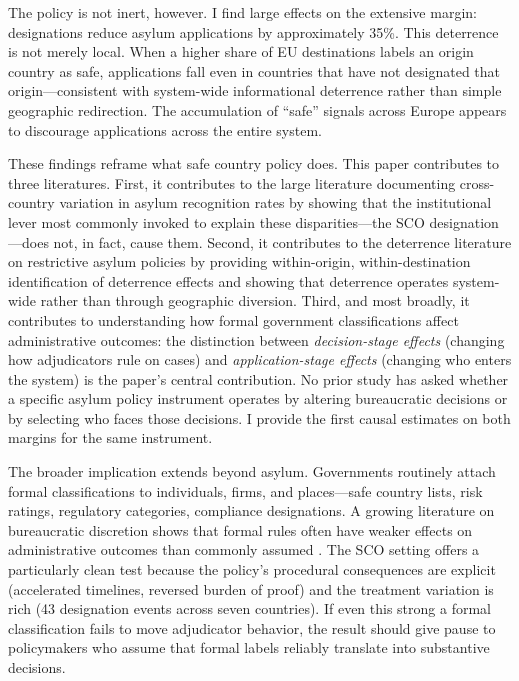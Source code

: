 \documentclass[12pt]{article}
\begin{document}
The policy is not inert, however. I find large effects on the extensive margin: designations reduce asylum applications by approximately 35\%. This deterrence is not merely local. When a higher share of EU destinations labels an origin country as safe, applications fall even in countries that have not designated that origin---consistent with system-wide informational deterrence rather than simple geographic redirection. The accumulation of ``safe'' signals across Europe appears to discourage applications across the entire system.

These findings reframe what safe country policy does. This paper contributes to three literatures. First, it contributes to the large literature documenting cross-country variation in asylum recognition rates \citep{neumayer2005asylum, hatton2009rise, toshkov2014asylum, ruedin2019asylum} by showing that the institutional lever most commonly invoked to explain these disparities---the SCO designation---does not, in fact, cause them. Second, it contributes to the deterrence literature on restrictive asylum policies \citep{hatton2004seeking, thielemann2006beyond, czaika2009effectiveness, ortega2013effect} by providing within-origin, within-destination identification of deterrence effects and showing that deterrence operates system-wide rather than through geographic diversion. Third, and most broadly, it contributes to understanding how formal government classifications affect administrative outcomes: the distinction between \textit{decision-stage effects} (changing how adjudicators rule on cases) and \textit{application-stage effects} (changing who enters the system) is the paper's central contribution. No prior study has asked whether a specific asylum policy instrument operates by altering bureaucratic decisions or by selecting who faces those decisions. I provide the first causal estimates on both margins for the same instrument.

The broader implication extends beyond asylum. Governments routinely attach formal classifications to individuals, firms, and places---safe country lists, risk ratings, regulatory categories, compliance designations. A growing literature on bureaucratic discretion shows that formal rules often have weaker effects on administrative outcomes than commonly assumed \citep{lipsky2010street}. The SCO setting offers a particularly clean test because the policy's procedural consequences are explicit (accelerated timelines, reversed burden of proof) and the treatment variation is rich (43 designation events across seven countries). If even this strong a formal classification fails to move adjudicator behavior, the result should give pause to policymakers who assume that formal labels reliably translate into substantive decisions.
\end{document}
